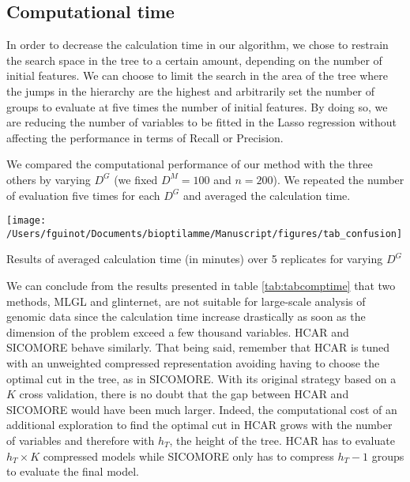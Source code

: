 \documentclass[]{book}
\begin{document}
\hypertarget{computational-time}{%
\subsection{Computational time}\label{computational-time}}

In order to decrease the calculation time in our algorithm, we chose to
restrain the search space in the tree to a certain amount, depending on
the number of initial features. We can choose to limit the search in the
area of the tree where the jumps in the hierarchy are the highest and
arbitrarily set the number of groups to evaluate at five times the
number of initial features. By doing so, we are reducing the number of
variables to be fitted in the Lasso regression without affecting the
performance in terms of Recall or Precision.

We compared the computational performance of our method with the three
others by varying \(D^{\mathit{G}}\) (we fixed \(D^{\mathit{M}} = 100\) and \(n = 200\)). We
repeated the number of evaluation five times for each \(D^{\mathit{G}}\) and
averaged the calculation time.

\begin{center}\texttt{[image: /Users/fguinot/Documents/bioptilamme/Manuscript/figures/tab\_confusion]} \end{center}

\label{tab:tabcomptime}Results of averaged calculation time (in minutes) over 5 replicates for varying \(D^{\mathit{G}}\)

We can conclude from the results presented in table \ref{tab:tabcomptime} that
two methods, MLGL and glinternet, are not suitable for large-scale
analysis of genomic data since the calculation time increase drastically
as soon as the dimension of the problem exceed a few thousand variables.
HCAR and SICOMORE behave similarly. That being said, remember that HCAR
is tuned with an unweighted compressed representation avoiding having to
choose the optimal cut in the tree, as in SICOMORE. With its original
strategy based on a \(K\) cross validation, there is no doubt that the gap
between HCAR and SICOMORE would have been much larger. Indeed, the
computational cost of an additional exploration to find the optimal cut
in HCAR grows with the number of variables and therefore with \(h_T\), the
height of the tree. HCAR has to evaluate \(h_T \times K\) compressed
models while SICOMORE only has to compress \(h_T-1\) groups to evaluate
the final model.
\end{document}
